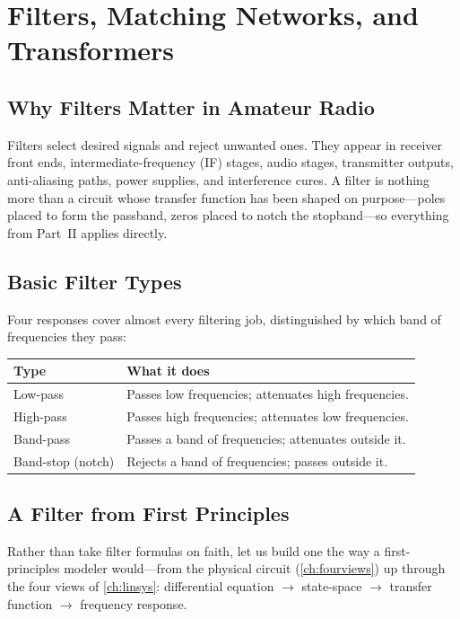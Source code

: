 \chapter{Filters, Matching Networks, and Transformers}
\label{ch:filters}
\section{Why Filters Matter in Amateur Radio}
Filters select desired signals and reject unwanted ones. They appear in receiver
front ends, intermediate-frequency (IF) stages, audio stages, transmitter
outputs, anti-aliasing paths,
power supplies, and interference cures. A filter is nothing more than a circuit
whose transfer function has been shaped on purpose---poles placed to form the
passband, zeros placed to notch the stopband---so everything from Part~II applies
directly.

\section{Basic Filter Types}
Four responses cover almost every filtering job, distinguished by which band of
frequencies they pass:

\begin{center}
\begin{tabularx}{\textwidth}{@{}L{0.26\textwidth}Y@{}}
\toprule
Type & What it does \\
\midrule
Low-pass & Passes low frequencies; attenuates high frequencies. \\
High-pass & Passes high frequencies; attenuates low frequencies. \\
Band-pass & Passes a band of frequencies; attenuates outside it. \\
Band-stop (notch) & Rejects a band of frequencies; passes outside it. \\
\bottomrule
\end{tabularx}
\end{center}

\section{A Filter from First Principles}
Rather than take filter formulas on faith, let us build one the way a
first-principles modeler would---from the physical circuit (\cref{ch:fourviews})
up through the four views of \cref{ch:linsys}: differential equation \(\to\)
state-space \(\to\) transfer function \(\to\) frequency response.

